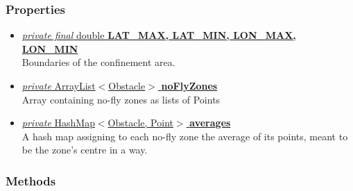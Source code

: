 \documentclass{article}
\newcommand{\prop}[3]{\underline{\textit{#1} #2 \textbf{#3}}}
\begin{document}
\subsubsection*{Properties}

\begin{itemize}
\item \prop{private final}{double}{LAT\_MAX, LAT\_MIN, LON\_MAX, LON\_MIN} \\
  Boundaries of the confinement area.
\item \prop{private}{ArrayList$<$Obstacle$>$}{noFlyZones} \\
  Array containing no-fly zones as lists of Points
\item \prop{private}{HashMap$<$Obstacle, Point$>$}{averages} \\
  A hash map assigning to each no-fly zone the average of its points, meant to be the zone's centre in a way.
\end{itemize}

\subsubsection*{Methods}
\end{document}
